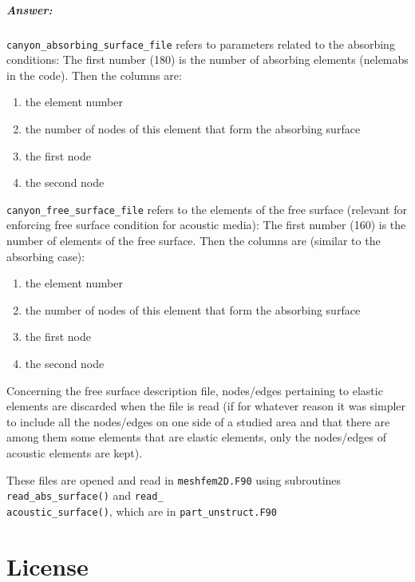 \documentclass[oneside,english,onecolumn,letterpaper]{book}
\begin{document}
\paragraph{Answer:} \texttt{canyon\_absorbing\_surface\_file} refers to parameters related to the
absorbing conditions:
The first number (180) is the number of absorbing elements (nelemabs in the
code).
Then the columns are:
\begin{enumerate}[wide=1em, label=column \arabic*:]
\item the element number
\item the number of nodes of this element that form the absorbing surface
\item the first node
\item the second node
\end{enumerate}

\texttt{canyon\_free\_surface\_file} refers to the elements of the free surface
(relevant for enforcing free surface condition for acoustic media):
The first number (160) is the number of  elements of the free surface.
Then the columns are (similar to the absorbing case):
\begin{enumerate}[wide=1em, label=column \arabic*:]
\item the element number
\item the number of nodes of this element that form the absorbing surface
\item the first node
\item the second node
\end{enumerate}

Concerning the free surface description file, nodes/edges pertaining to
elastic elements are discarded when the file is read (if for whatever
reason it was simpler to include all the nodes/edges on one side of a
studied area and that there are among them some elements that are
elastic elements, only the nodes/edges of acoustic elements are kept).

These files are opened and read in \texttt{meshfem2D.F90} using subroutines
\texttt{read\_abs\_surface()} and \texttt{read\_}~\\
\texttt{acoustic\_surface()}, which are in \texttt{part\_unstruct.F90}


\chapter{\label{cha:License}License}
\end{document}
